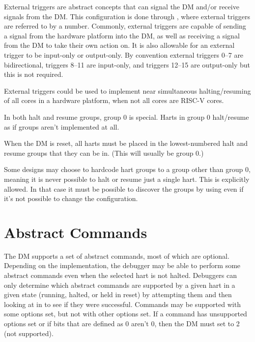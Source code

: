 External triggers are abstract concepts that can signal the DM and/or receive
signals from the DM. This configuration is done through \RdmDmcsTwo, where
external triggers are referred to by a number. Commonly, external triggers
are capable of sending a signal from the hardware platform into the DM, as well as
receiving a signal from the DM to take their own action on. It is also
allowable for an external trigger to be input-only or output-only. By
convention external triggers 0--7 are bidirectional, triggers 8--11 are
input-only, and triggers 12--15 are output-only but this is not required.

\begin{commentary}
    External triggers could be used to implement near simultaneous
    halting/resuming of all cores in a hardware platform, when not all cores are RISC-V
    cores.
\end{commentary}

In both halt and resume groups, group 0 is special. Harts in group 0
halt/resume as if groups aren't implemented at all.

When the DM is reset, all harts must be placed in the lowest-numbered halt and
resume groups that they can be in. (This will usually be group 0.)

Some designs may choose to hardcode hart groups to a group other than group 0,
meaning it is never possible to halt or resume just a single hart. This is
explicitly allowed. In that case it must be possible to discover the groups by
using \RdmDmcsTwo even if it's not possible to change the configuration.

\section{Abstract Commands} \label{abstractcommands}

The DM supports a set of abstract commands, most of which
are optional. Depending on the implementation, the debugger may
be able to perform
some abstract commands even when the selected hart is not halted.
Debuggers can only determine which abstract commands
are supported by a given hart in a given state (running, halted, or held in reset) by attempting them
and then looking at \FdmAbstractcsCmderr in \RdmAbstractcs to see if they were successful.
Commands may be supported with some options set, but not with other options
set. If a command has unsupported options set or if bits that are defined as 0
aren't 0, then the DM must set \FdmAbstractcsCmderr to 2 (not supported).

